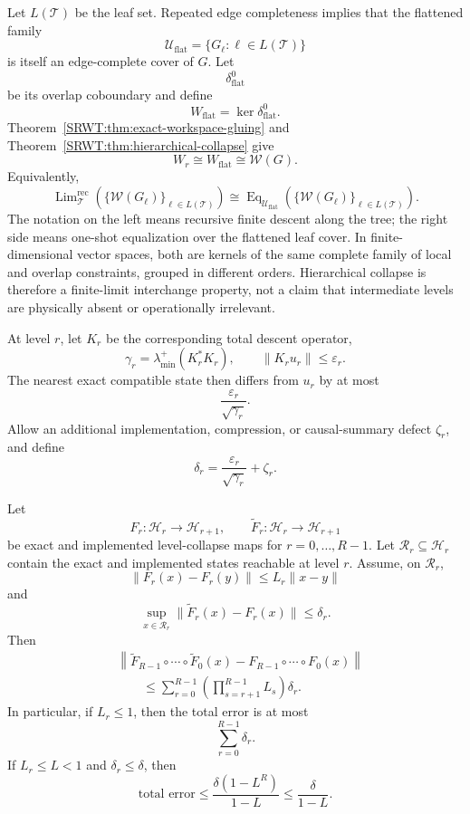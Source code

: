 Let \(L(\mathcal T)\) be the leaf set. Repeated edge completeness implies that
the flattened family
\[
\mathcal U_{\mathrm{flat}}
=
\{G_\ell:\ell\in L(\mathcal T)\}
\]
is itself an edge-complete cover of \(G\). Let
\[
\delta_{\mathrm{flat}}^0
\]
be its overlap coboundary and define
\[
W_{\mathrm{flat}}
=
\ker\delta_{\mathrm{flat}}^0.
\]
Theorem~\ref{SRWT:thm:exact-workspace-gluing} and
Theorem~\ref{SRWT:thm:hierarchical-collapse} give
\[
\boxed{
W_r
\cong
W_{\mathrm{flat}}
\cong
\mathscr W(G).
}
\]
Equivalently,
\[
\boxed{
\operatorname{Lim}_{\mathcal T}^{\mathrm{rec}}
\left(
\{\mathscr W(G_\ell)\}_{\ell\in L(\mathcal T)}
\right)
\cong
\operatorname{Eq}_{\mathcal U_{\mathrm{flat}}}
\left(
\{\mathscr W(G_\ell)\}_{\ell\in L(\mathcal T)}
\right).
}
\]
The notation on the left means recursive finite descent along the tree; the
right side means one-shot equalization over the flattened leaf cover. In
finite-dimensional vector spaces, both are kernels of the same complete family
of local and overlap constraints, grouped in different orders. Hierarchical
collapse is therefore a finite-limit interchange property, not a claim that
intermediate levels are physically absent or operationally irrelevant.


At level \(r\), let \(K_r\) be the corresponding total descent operator,
\[
\gamma_r
=
\lambda_{\min}^+(K_r^*K_r),
\qquad
\|K_ru_r\|\leq\varepsilon_r.
\]
The nearest exact compatible state then differs from \(u_r\) by at most
\[
\frac{\varepsilon_r}{\sqrt{\gamma_r}}.
\]
Allow an additional implementation, compression, or causal-summary defect
\(\zeta_r\), and define
\[
\delta_r
=
\frac{\varepsilon_r}{\sqrt{\gamma_r}}
+
\zeta_r.
\]

\begin{SRWTtheorem}\label{SRWT:thm:approx-hierarchical-collapse}
Let
\[
F_r:\mathcal H_r\to\mathcal H_{r+1},
\qquad
\widetilde F_r:\mathcal H_r\to\mathcal H_{r+1}
\]
be exact and implemented level-collapse maps for
\(r=0,\ldots,R-1\). Let \(\mathcal R_r\subseteq\mathcal H_r\) contain the exact
and implemented states reachable at level \(r\). Assume, on \(\mathcal R_r\),
\[
\|F_r(x)-F_r(y)\|
\leq
L_r\|x-y\|
\]
and
\[
\sup_{x\in\mathcal R_r}
\|\widetilde F_r(x)-F_r(x)\|
\leq
\delta_r.
\]
Then
\[
\boxed{
\begin{aligned}
&\left\|
\widetilde F_{R-1}\circ\cdots\circ\widetilde F_0(x)
-
F_{R-1}\circ\cdots\circ F_0(x)
\right\|\\
&\qquad\leq
\sum_{r=0}^{R-1}
\left(
\prod_{s=r+1}^{R-1}L_s
\right)
\delta_r.
\end{aligned}
}
\]
In particular, if \(L_r\leq1\), then the total error is at most
\[
\sum_{r=0}^{R-1}\delta_r.
\]
If \(L_r\leq L<1\) and \(\delta_r\leq\delta\), then
\[
\boxed{
\text{total error}
\leq
\frac{\delta(1-L^R)}{1-L}
\leq
\frac{\delta}{1-L}.
}
\]
\end{SRWTtheorem}

